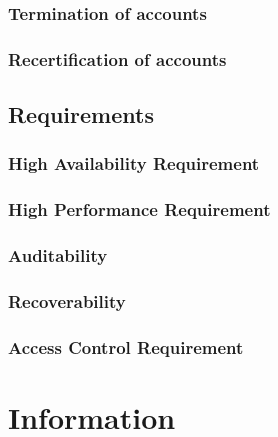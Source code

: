 \hypertarget{termination-of-accounts}{%
\subsubsection{Termination of accounts}\label{termination-of-accounts}}

\hypertarget{recertification-of-accounts}{%
\subsubsection{Recertification of
accounts}\label{recertification-of-accounts}}

\hypertarget{requirements}{%
\subsection{Requirements}\label{requirements}}

\hypertarget{high-availability-requirement}{%
\subsubsection{High Availability
Requirement}\label{high-availability-requirement}}

\hypertarget{high-performance-requirement}{%
\subsubsection{High Performance
Requirement}\label{high-performance-requirement}}

\hypertarget{auditability}{%
\subsubsection{Auditability}\label{auditability}}

\hypertarget{recoverability}{%
\subsubsection{Recoverability}\label{recoverability}}

\hypertarget{access-control-requirement}{%
\subsubsection{Access Control
Requirement}\label{access-control-requirement}}

\hypertarget{information}{%
\section{Information}\label{information}}

